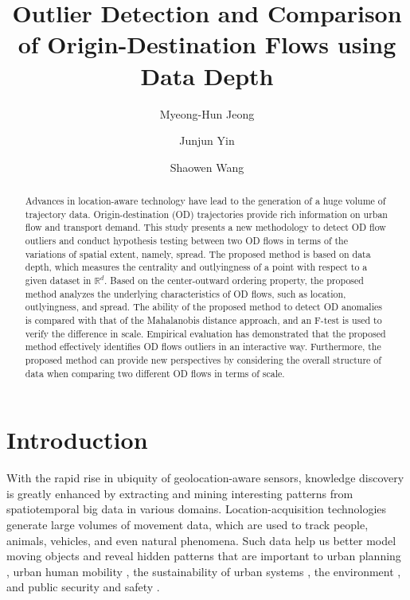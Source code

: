 \documentclass[a4paper,UKenglish]{lipics-v2018}
\title{Outlier Detection and Comparison of Origin-Destination Flows using Data Depth}
\author{Myeong-Hun Jeong}{Department of Civil Engineering, Chosun University, Gwangju, Republic of Korea}{mhjeong@chosun.ac.kr}{[orcid]}{[funding]}
\author{Junjun Yin}{Social Science Research Institute; Institute for CyberScience, Penn State University, PA, USA}{jyin@psu.edu}{[0000-0002-4196-2439]}{[This work used the Extreme Science and Engineering Discovery Environment (XSEDE), which is supported by National Science Foundation grant number ACI-1548562]}
\author{Shaowen Wang}{Department of Geography and Geographic Information Science, University of Illinois at Urbana-Champaign, IL, USA}{shaowen@illinois.edu}{[orcid]}{[funding]}
\begin{document}
\maketitle

\begin{abstract}
Advances in location-aware technology have lead to the generation of a huge volume of trajectory data.
Origin-destination (OD) trajectories provide rich information on urban flow and transport demand.
This study presents a new methodology to detect OD flow outliers and conduct hypothesis testing between two OD flows in terms of the variations of spatial extent, namely, spread.
The proposed method is based on data depth, which measures the centrality and outlyingness of a point with respect to a given dataset in $\mathbb{R}^d$.
Based on the center-outward ordering property, the proposed method analyzes the underlying characteristics of OD flows, such as location, outlyingness, and spread.
The ability of the proposed method to detect OD anomalies is compared with that of the Mahalanobis distance approach, and an F-test is used to verify the difference in scale. Empirical evaluation has demonstrated that the proposed method effectively identifies OD flows outliers in an interactive way. Furthermore, the proposed method can provide new perspectives by considering the overall structure of data when comparing two different OD flows in terms of scale. 

 \end{abstract}

\section{Introduction}
With the rapid rise in ubiquity of geolocation-aware sensors, knowledge discovery is greatly enhanced by extracting and mining interesting patterns from spatiotemporal big data in various domains.
Location-acquisition technologies generate large volumes of movement data, which are used to track people, animals, vehicles, and even natural phenomena.
Such data help us better model moving objects and reveal hidden patterns that are important to urban planning \cite{mazimpaka15AGILE}, urban human mobility \cite{yin2017depicting,kwan1998space}, the sustainability of urban systems \cite{alberti2003integrating,chen13Percom}, the environment \cite{devarakonda13SIGKDD}, and public security and safety \cite{buchin14JOSIS}.
\end{document}
